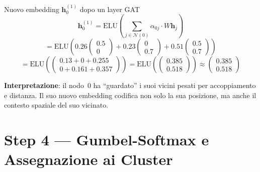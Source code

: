 \documentclass[11pt,a4paper]{article}
\begin{document}
\begin{stepbox}{Nuovo embedding $\mathbf{h}_0^{(1)}$ dopo un layer GAT}
\[
\mathbf{h}_0^{(1)} = \text{ELU}\!\left(\sum_{j\in\mathcal{N}(0)}\alpha_{0j}\cdot W\mathbf{h}_j\right)
\]
\[
= \text{ELU}\!\left(
  0.26\begin{pmatrix}0.5\\0\end{pmatrix}
+ 0.23\begin{pmatrix}0\\0.7\end{pmatrix}
+ 0.51\begin{pmatrix}0.5\\0.7\end{pmatrix}
\right)
\]
\[
= \text{ELU}\!\left(\begin{pmatrix}0.13+0+0.255\\0+0.161+0.357\end{pmatrix}\right)
= \text{ELU}\!\left(\begin{pmatrix}0.385\\0.518\end{pmatrix}\right)
\approx \begin{pmatrix}0.385\\0.518\end{pmatrix}
\]

\textbf{Interpretazione}: il nodo~0 ha ``guardato'' i suoi vicini pesati per accoppiamento e distanza. Il suo nuovo embedding codifica non solo la sua posizione, ma anche il contesto spaziale del suo vicinato.
\end{stepbox}

\section*{Step 4 --- Gumbel-Softmax e Assegnazione ai Cluster}
\end{document}
